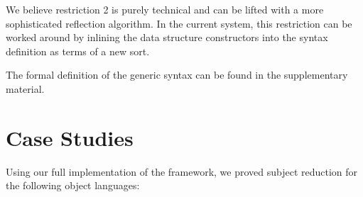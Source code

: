 \documentclass[a4paper, UKenglish, cleveref, autoref, thm-restate]{lipics-v2021}
\begin{document}

  We believe restriction 2 is purely technical and can be lifted
  with a more sophisticated reflection algorithm. In the current system,
  this restriction can be worked around by inlining the data structure
  constructors into the syntax definition as terms of a new sort.

  The formal definition of the generic syntax can be found in
  the supplementary material.



  \section{Case Studies}
  \label{sec:casestudies}
  Using our full implementation of the framework, we proved subject
  reduction for the following object languages:
\end{document}
